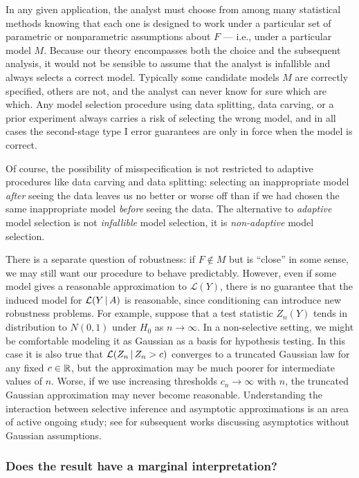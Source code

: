 \documentclass{article}
\theoremstyle{definition}
\newcommand{\cL}{\mathcal{L}}
\newcommand{\sampOrData}{data }
\begin{document}
In any given application, the analyst must choose from among many statistical methods knowing that each one is designed to work under a particular set of parametric or nonparametric assumptions about $F$ --- i.e., under a particular model $M$. Because our theory encompasses both the choice and the subsequent analysis, it would not be sensible to assume that the analyst is infallible and always selects a correct model. Typically some candidate models $M$ are correctly specified, others are not, and the analyst can never know for sure which are which. Any model selection procedure using data splitting, data carving, or a prior experiment always carries a risk of selecting the wrong model, and in all cases the second-stage type I error guarantees are only in force when the model is correct.

Of course, the possibility of misspecification is not restricted to adaptive procedures like \sampOrData carving and \sampOrData splitting: selecting an inappropriate model {\em after} seeing the data leaves us no better or worse off than if we had chosen the same inappropriate model {\em before} seeing the data. The alternative to {\em adaptive} model selection is not {\em infallible} model selection, it is {\em non-adaptive} model selection.

There is a separate question of robustness: if $F\notin M$ but is ``close'' in some sense, we may still want our procedure to behave predictably. However, even if some model gives a reasonable approximation to $\cL(Y)$, there is no guarantee that the induced model for $\cL(Y \gv A)$ is reasonable, since conditioning can introduce new robustness problems.
For example, suppose that a test statistic $Z_n(Y)$ tends in distribution to $N(0,1)$ under $H_0$ as $n\to \infty$. In a non-selective setting, we might be comfortable modeling it as Gaussian as a basis for hypothesis testing. In this case it is also true that ${\cL(Z_n \gv Z_n > c)}$ converges to a truncated Gaussian law for any fixed $c\in \mathbb{R}$, but the approximation may be much poorer for intermediate values of $n$. Worse, if we use increasing thresholds $c_n\to\infty$ with $n$, the truncated Gaussian approximation may never become reasonable. Understanding the interaction between selective inference and asymptotic approximations is an area of active ongoing study; see \citet{tian2017asymptotics,tibshirani2015uniform,tian2015selective,taylor2016post} for subsequent works discussing asymptotics without Gaussian assumptions.

\subsubsection{Does the result have a marginal interpretation?}\label{sec:margInterp}
\end{document}
